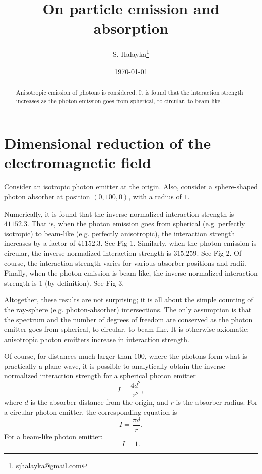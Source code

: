 \documentclass[12pt]{article}
\title{On particle emission and absorption}
\author{S. Halayka\footnote{sjhalayka@gmail.com}}
\date{\today}
\begin{document}
\maketitle

\begin{abstract}
Anisotropic emission of photons is considered.
It is found that the interaction strength increases as the photon emission goes from spherical, to circular, to beam-like.
\end{abstract}



\section{Dimensional reduction of the electromagnetic field}
Consider an isotropic photon emitter at the origin.
Also, consider a sphere-shaped photon absorber at position $(0, 100, 0)$, with a radius of $1$.

Numerically, it is found that the inverse normalized interaction strength is $41152.3$.
That is, when the photon emission goes from spherical (e.g. perfectly isotropic) to beam-like (e.g. perfectly anisotropic), the interaction strength increases by a factor of $41152.3$.
See Fig 1.
Similarly, when the photon emission is circular, the inverse normalized interaction strength is $315.259$.
See Fig 2.
Of course, the interaction strength varies for various absorber positions and radii.
Finally, when the photon emission is beam-like, the inverse normalized interaction strength is $1$ (by definition).
See Fig 3.

Altogether, these results are not surprising; it is all about the simple counting of the ray-sphere (e.g. photon-absorber) intersections. 
The only assumption is that the spectrum and the number of degrees of freedom are conserved as the photon emitter goes from spherical, to circular, to beam-like.
It is otherwise axiomatic: anisotropic photon emitters increase in interaction strength.

Of course, for distances much larger than $100$, where the photons form what is practically a plane wave, it is possible to analytically obtain the inverse normalized interaction strength for a spherical photon emitter
\begin{equation}
I = \frac{4 d^2}{r^2},
\end{equation}
where $d$ is the absorber distance from the origin, and $r$ is the absorber radius.
For a circular photon emitter, the corresponding equation is
\begin{equation}
I = \frac{\pi d}{r}.
\end{equation}
For a beam-like photon emitter:
\begin{equation}
I = 1.
\end{equation}
\end{document}
